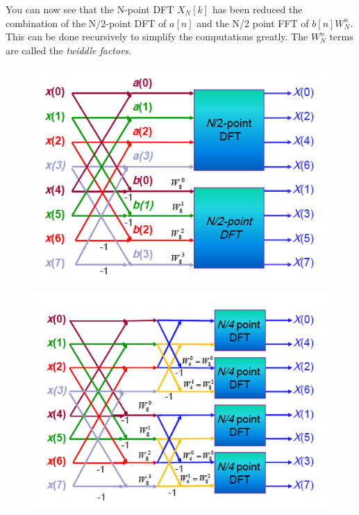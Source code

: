 \documentclass{article}
\begin{document}
You can now see that the N-point DFT $X_{N}[k]$ has been reduced the combination of the N/2-point DFT of $a[n]$ and
the N/2 point FFT of $b[n]W_{N}^{n}$. This can be done recursively to simplify the computations greatly.
The $W_{N}^{n}$ terms are called the \emph{twiddle factors}.

\begin{figure}[h!]
  \begin{minipage}{0.5\textwidth}
    \centering
    \includegraphics[width=\linewidth]{dif_1.png}
      \label{fig:dif1}
  \end{minipage}
  \begin{minipage}{0.5\textwidth}
    \centering
    \includegraphics[width=\linewidth]{dif_2.png}
      \label{fig:dif2}
 \end{minipage}
\end {figure}
\end{document}
